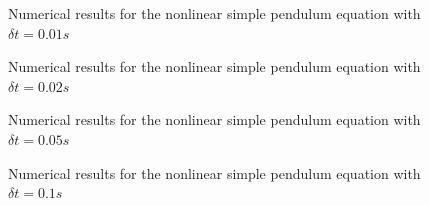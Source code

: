 \documentclass[a4paper,11pt]{report}
\begin{document}
\begin{enumerate}
    \begin{figure}[H]
    \centering
    \resizebox{0.95\linewidth}{!}{}
    \end{figure}

    \begin{figure}[H]
    \centering
    \resizebox{0.95\linewidth}{!}{}
    \caption{Numerical results for the nonlinear simple pendulum equation
    with $\delta t = 0.01s$}
    \end{figure}

    \begin{figure}[H]
    \centering
    \resizebox{0.95\linewidth}{!}{}
    \end{figure}

    \begin{figure}[H]
    \centering
    \resizebox{0.95\linewidth}{!}{}
    \caption{Numerical results for the nonlinear simple pendulum equation
    with $\delta t = 0.02s$}
    \end{figure}
    
    \begin{figure}[H]
    \centering
    \resizebox{0.95\linewidth}{!}{}
    \end{figure}

    \begin{figure}[H]
    \centering
    \resizebox{0.95\linewidth}{!}{}
    \caption{Numerical results for the nonlinear simple pendulum equation
    with $\delta t = 0.05s$}
    \end{figure}

    \begin{figure}[H]
    \centering
    \resizebox{0.95\linewidth}{!}{}
    \end{figure}

    \begin{figure}[H]
    \centering
    \resizebox{0.95\linewidth}{!}{}
    \caption{Numerical results for the nonlinear simple pendulum equation
    with $\delta t = 0.1s$}
    \end{figure}

    \begin{figure}[H]
    \centering
    \resizebox{0.95\linewidth}{!}{}
    \end{figure}


\end{enumerate}
\end{document}
